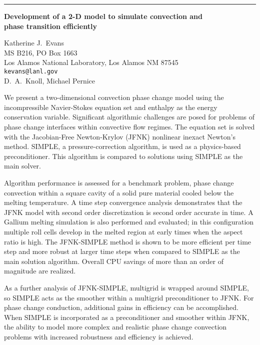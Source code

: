 \documentclass[twosided]{report}
\begin{document}
	\begin{center} \rule{6in}{1pt} \end{center}

\begin{center}
{\large			%
{\bf Development of a 2-D model to simulate convection and \\
	phase transition efficiently}}

	Katherine J.~Evans \\
	MS B216, PO Box 1663 \\
	Los Alamos National Laboratory, Los Alamos NM 87545 \\
	{\tt kevans@lanl.gov} \\
	D.~A.~Knoll, Michael Pernice
\end{center}
We present a two-dimensional convection phase change model
using the incompressible Navier-Stokes equation set and
enthalpy as the energy conservation variable. Significant
algorithmic challenges are posed for problems of phase
change interfaces within convective flow regimes. The
equation set is solved with the Jacobian-Free Newton-Krylov
(JFNK) nonlinear inexact Newton's method. SIMPLE, a
pressure-correction algorithm, is used as a physics-based
preconditioner. This algorithm is compared to solutions
using SIMPLE as the main solver.

Algorithm performance is
assessed for a benchmark problem, phase change convection
within a square cavity of a solid pure material cooled below
the melting temperature. A time step convergence analysis
demonstrates that the JFNK model with second order
discretization is second order accurate in time. A Gallium
melting simulation is also performed and evaluated; in this
configuration multiple roll cells develop in the melted
region at early times when the aspect ratio is high. The
JFNK-SIMPLE method is shown to be more efficient per time
step and more robust at larger time steps when compared to
SIMPLE as the main solution algorithm. Overall CPU savings
of more than an order of magnitude are realized.

As a
further analysis of JFNK-SIMPLE, multigrid is wrapped around
SIMPLE, so SIMPLE acts as the smoother within a multigrid
preconditioner to JFNK. For phase change conduction,
additional gains in efficiency can be accomplished. When
SIMPLE is incorporated as a preconditioner and smoother
within JFNK, the ability to model more complex and realistic
phase change convection problems with increased robustness
and efficiency is achieved.
\end{document}
